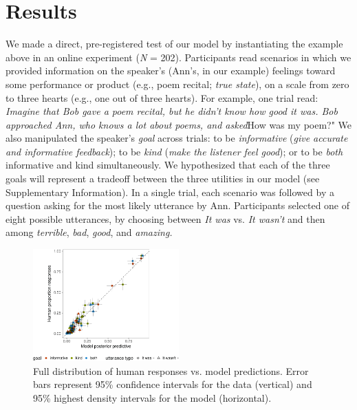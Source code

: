 \documentclass[9pt,twocolumn,twoside,lineno]{main_class_file}
\begin{document}
\section*{Results}

We made a direct, pre-registered test of our model by instantiating the
example above in an online experiment (\emph{N} = 202). Participants
read scenarios in which we provided information on the speaker's (Ann's,
in our example) feelings toward some performance or product (e.g., poem
recital; \emph{true state}), on a scale from zero to three hearts (e.g.,
one out of three hearts). For example, one trial read: \emph{Imagine
that Bob gave a poem recital, but he didn't know how good it was. Bob
approached Ann, who knows a lot about poems, and asked}How was my poem?"
We also manipulated the speaker's \emph{goal} across trials: to be
\emph{informative} (\emph{give accurate and informative feedback});
to be \emph{kind} (\emph{make the listener feel good}); or to be
\emph{both} informative and kind simultaneously. We hypothesized that
each of the three goals will represent a tradeoff between the three
utilities in our model (see Supplementary Information). In a single
trial, each scenario was followed by a question asking for the most
likely utterance by Ann. Participants selected one of eight possible
utterances, by choosing between \emph{It was} vs. \emph{It wasn't} and
then among \emph{terrible}, \emph{bad}, \emph{good}, and \emph{amazing.}

\begin{figure}[!h]
\includegraphics[width=0.5\textwidth]{fig/variance-1} \caption{Full distribution of human responses vs. model predictions. Error bars represent 95\% confidence intervals for the data (vertical) and 95\% highest density intervals for the model (horizontal).}\label{fig:variance}
\end{figure}
\end{document}
